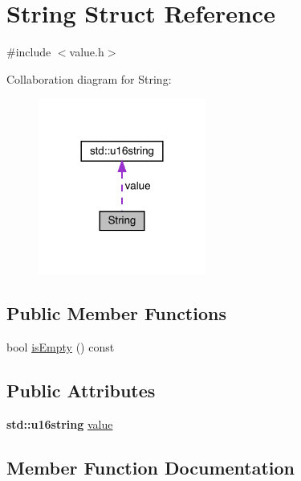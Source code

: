 \hypertarget{struct_string}{}\section{String Struct Reference}
\label{struct_string}


{\ttfamily \#include $<$value.\+h$>$}



Collaboration diagram for String\+:\nopagebreak
\begin{figure}[H]
\begin{center}
\leavevmode
\includegraphics[width=156pt]{struct_string__coll__graph}
\end{center}
\end{figure}
\subsection*{Public Member Functions}
\begin{DoxyCompactItemize}
\item 
bool \hyperlink{struct_string_a47438e7b744f5b96be767302c525b351}{is\+Empty} () const
\end{DoxyCompactItemize}
\subsection*{Public Attributes}
\begin{DoxyCompactItemize}
\item 
\textbf{ std\+::u16string} \hyperlink{struct_string_a8d279ee262f09d4e861c4578f85df015}{value}
\end{DoxyCompactItemize}


\subsection{Member Function Documentation}
\mbox{\label{struct_string_a47438e7b744f5b96be767302c525b351}} 
